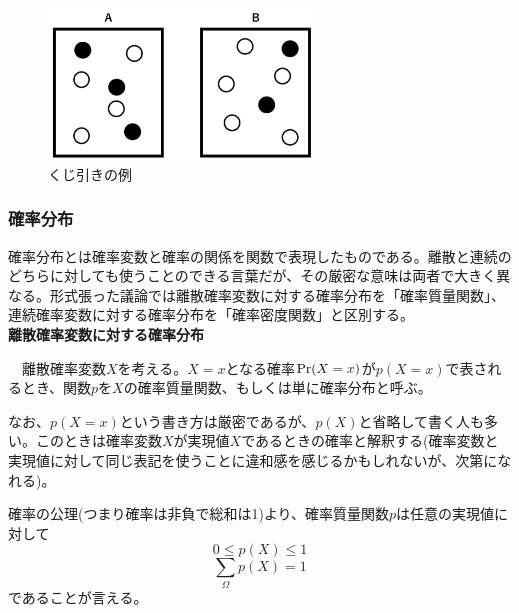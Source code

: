 \documentclass[dvipdfmx, 9pt, a4paper]{jsarticle}
\begin{document}
\begin{figure}[tb]
\begin{center}
\includegraphics[width=7cm]{"fig1.png"}
\caption{くじ引きの例}
\end{center}
\end{figure}

\subsubsection{確率分布}
確率分布とは確率変数と確率の関係を関数で表現したものである。離散と連続のどちらに対しても使うことのできる言葉だが、その厳密な意味は両者で大きく異なる。形式張った議論では離散確率変数に対する確率分布を「確率質量関数」、連続確率変数に対する確率分布を「確率密度関数」と区別する。 \bigskip \\
{\bf 離散確率変数に対する確率分布}
\begin{tcolorbox}[title=確率質量関数]
　離散確率変数$X$を考える。$X=x$となる確率${\rm Pr}(X=x)$が$p(X=x)$で表されるとき、関数$p$を$X$の確率質量関数、もしくは単に確率分布と呼ぶ。
\end{tcolorbox}
なお、$p(X=x)$という書き方は厳密であるが、$p(X)$と省略して書く人も多い。このときは確率変数$X$が実現値$X$であるときの確率と解釈する(確率変数と実現値に対して同じ表記を使うことに違和感を感じるかもしれないが、次第になれる)。\par
確率の公理(つまり確率は非負で総和は1)より、確率質量関数$p$は任意の実現値に対して
\begin{equation}
0 \leq p(X) \leq 1
\end{equation}
\begin{equation}
\sum_\Omega p(X) = 1
\end{equation}
であることが言える。\bigskip
\end{document}

